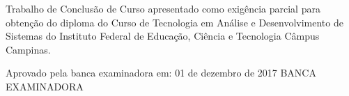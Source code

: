 \begin{folhadeaprovacao}
\linespread{1.5}

  \begin{center}
    {\chapterfont \insereautor}
    \vfill\vspace{2cm}
    {\chapterfont\bfseries \inseretitulo}
    \vfill\vspace{1.5cm}
    \end{center}
    
    \hspace{.45\textwidth}
    \begin{minipage}{.47\linewidth}
	\vfill	
	Trabalho de Conclus\~{a}o de Curso apresentado como exig\^encia parcial para obten\c{c}\~{a}o do diploma do Curso de Tecnologia em An\'{a}lise e Desenvolvimento de Sistemas do Instituto Federal de Educa\c{c}\~{a}o, Ci\^{e}ncia e Tecnologia C\^{a}mpus Campinas.
    \end{minipage}
\vfill\vspace{1cm}  

\begin{center}
Aprovado pela banca examinadora em: 01 de dezembro de 2017
\vfill \vspace{1cm}
{\large BANCA EXAMINADORA}
\end{center}
\end{folhadeaprovacao}
